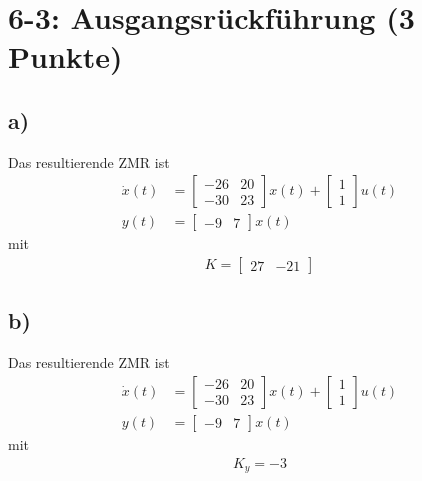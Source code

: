 \documentclass[11pt]{scrartcl} %
\begin{document}
\section*{6-3: Ausgangsrückführung (3 Punkte)}
\subsection*{a)}
Das resultierende ZMR ist
\begin{align*}
\dot{x}(t) &= \begin{bmatrix}
-26 &  20 \\
-30 &  23
\end{bmatrix} x(t) + \begin{bmatrix}
1 \\ 1
\end{bmatrix} u(t) \\
y(t) &= \begin{bmatrix}
-9 & 7
\end{bmatrix} x(t)
\end{align*}
mit
\begin{align*}
K = \begin{bmatrix}
27 & -21
\end{bmatrix}
\end{align*}

\subsection*{b)}
Das resultierende ZMR ist
\begin{align*}
\dot{x}(t) &= \begin{bmatrix}
-26 &  20 \\
-30 &  23
\end{bmatrix} x(t) + \begin{bmatrix}
1 \\ 1
\end{bmatrix} u(t) \\
y(t) &= \begin{bmatrix}
-9 & 7
\end{bmatrix} x(t)
\end{align*}
mit
\begin{align*}
K_y = -3
\end{align*}
\end{document}
